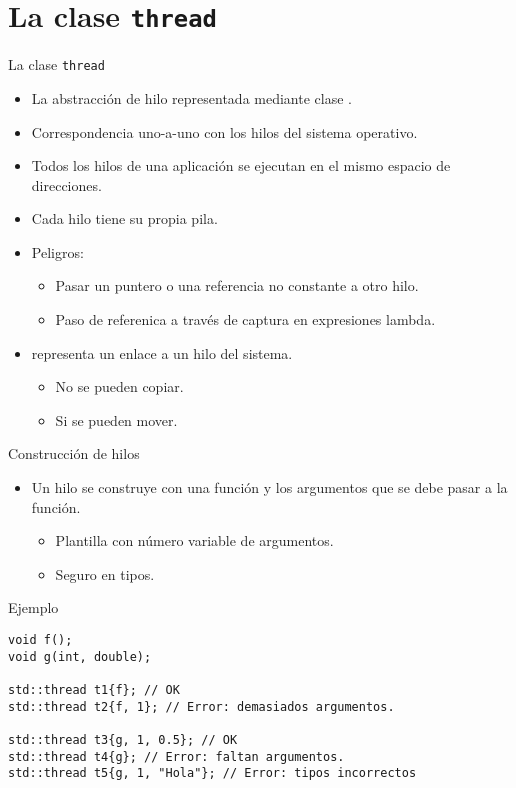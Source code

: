 \section{La clase \texttt{thread}}

\begin{frame}{La clase \texttt{thread}}
\begin{itemize}
  \item La abstracción de hilo representada mediante clase .
  \item Correspondencia uno-a-uno con los hilos del sistema operativo.
  \item Todos los hilos de una aplicación se ejecutan en el mismo espacio de direcciones.
  \item Cada hilo tiene su propia pila.
  \item Peligros:
    \begin{itemize}
      \item Pasar un puntero o una referencia no constante a otro hilo.
      \item Paso de referenica a través de captura en expresiones lambda.
    \end{itemize}
  \item {} representa un enlace a un hilo del sistema.
    \begin{itemize}
      \item No se pueden copiar.
      \item Si se pueden mover.
    \end{itemize}
\end{itemize}
\end{frame}

\begin{frame}[fragile]{Construcción de hilos}
\begin{itemize}
  \item Un hilo se construye con una función y los argumentos que se debe pasar a la función.
    \begin{itemize}
      \item Plantilla con número variable de argumentos.
      \item Seguro en tipos.
    \end{itemize}
\end{itemize}
\begin{block}{Ejemplo}
\begin{lstlisting}
void f();
void g(int, double);

std::thread t1{f}; // OK
std::thread t2{f, 1}; // Error: demasiados argumentos.

std::thread t3{g, 1, 0.5}; // OK
std::thread t4{g}; // Error: faltan argumentos.
std::thread t5{g, 1, "Hola"}; // Error: tipos incorrectos
\end{lstlisting}
\end{block}
\end{frame}

